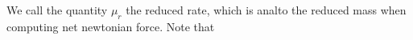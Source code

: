 We call the quantity \(\mu_r\) the reduced rate, which is analto the reduced mass when computing net newtonian force.  Note that